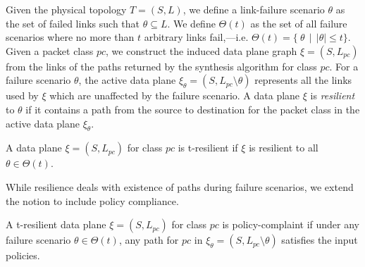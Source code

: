 Given the physical topology $T=(S,L)$, we define a link-failure
scenario $\theta$ as the set of failed links such that $\theta \subseteq L$.
	We define $\Theta(t)$ as the set of all failure scenarios where no more than $t$
	arbitrary links fail,---i.e. $\Theta(t) = \{ \ \theta \ \ | \ \ |\theta| \leq t\}$.
Given a packet class $pc$,
we construct the induced data plane graph $\xi = (S, L_{pc})$ from the links
of the paths returned by the synthesis algorithm for class $pc$.
 For a failure scenario
$\theta$, the active data plane $\xi_\theta = (S, L_{pc} \setminus \theta)$ represents
all the links used by $\xi$ which are unaffected by the failure scenario. A data
plane $\xi$ is {\em resilient} to $\theta$ if it contains a path from the source to 
destination for the packet class in the active data plane $\xi_\theta$.
\begin{mydef}[Resilience]
	A data plane $\xi = (S, L_{pc})$ for class $pc$ is t-resilient if $\xi$ is 
	resilient to all $\theta \in \Theta(t)$.
\end{mydef}
While resilience deals with 
existence of paths during failure scenarios,
we extend the notion to include policy compliance.
\begin{mydef}
	A t-resilient data plane $\xi = (S, L_{pc})$ for class $pc$ is policy-complaint if under
	any failure scenario $\theta \in \Theta(t)$, any path for $pc$ in 
	$\xi_\theta=(S, L_{pc} \setminus \theta)$ satisfies the input policies. 
\end{mydef}

